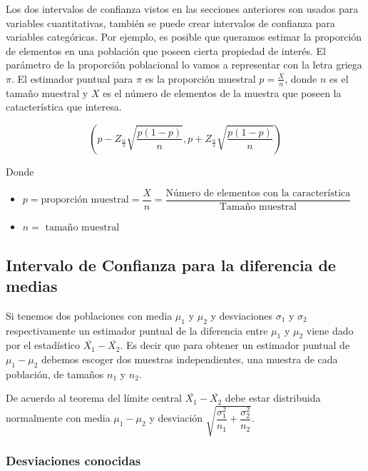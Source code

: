 \documentclass[]{book}
\begin{document}
Los dos intervalos de confianza vistos en las secciones anteriores son usados para variables cuantitativas, también se puede crear intervalos de confianza para variables categóricas. Por ejemplo, es posible que queramos estimar la proporción de elementos en una población que poseen cierta propiedad de interés. El parámetro de la proporción poblacional lo vamos a representar con la letra griega \(\pi\). El estimador puntual para \(\pi\) es la proporción muestral \(p=\frac{X}{n}\), donde \(n\) es el tamaño muestral y \(X\) es el número de elementos de la muestra que poseen la catacterística que interesa.

\begin{equation} 
  \left(p - Z_{\frac{\alpha}{2}}\sqrt{\dfrac{p\left(1-p\right)}{n}}, p + Z_{\frac{\alpha}{2}}\sqrt{\dfrac{p\left(1-p\right)}{n}}  \right)
  \label{eq:icprop}
\end{equation}

Donde

\begin{itemize}
\item
  \(p=\text{proporción muestral}=\dfrac{X}{n} =\dfrac{\text{Número de elementos con la característica}}{\text{Tamaño muestral}}\)
\item
  \(n= \text{ tamaño muestral}\)
\end{itemize}

\hypertarget{intervalo-de-confianza-para-la-diferencia-de-medias}{%
\subsection{Intervalo de Confianza para la diferencia de medias}\label{intervalo-de-confianza-para-la-diferencia-de-medias}}

Si tenemos dos poblaciones con media \(\mu_1\) y \(\mu_2\) y desviaciones \(\sigma_1\) y \(\sigma_2\) respectivamente un estimador puntual de la diferencia entre \(\mu_1\) y \(\mu_2\) viene dado por el estadístico \(\bar{X_1}-\bar{X_2}\). Es decir que para obtener un estimador puntual de \(\mu_1-\mu_2\) debemos escoger dos muestras independientes, una muestra de cada población, de tamaños \(n_1\) y \(n_2\).

De acuerdo al teorema del límite central \(\bar{X_1}-\bar{X_2}\) debe estar distribuida normalmente con media \(\mu_1 - \mu_2\) y desviación \(\sqrt{\dfrac{\sigma_1^2}{n_1} + \dfrac{\sigma_2^2}{n_2}}\).

\hypertarget{desviaciones-conocidas}{%
\subsubsection{Desviaciones conocidas}\label{desviaciones-conocidas}}
\end{document}

